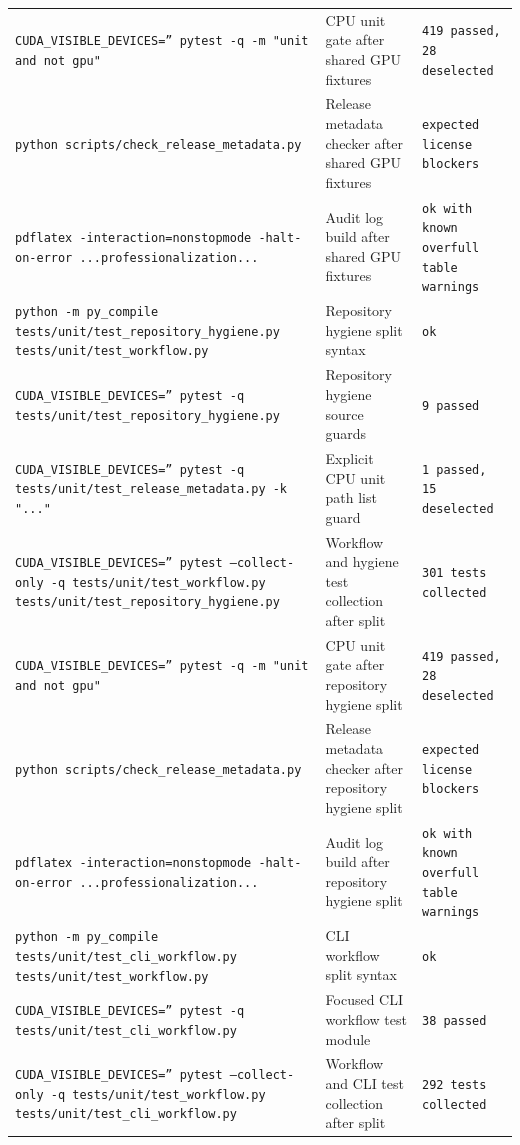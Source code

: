 \documentclass[11pt]{article}
\begin{document}
\begin{center}
\begin{tabular}{lll}
\texttt{CUDA\_VISIBLE\_DEVICES='' pytest -q -m "unit and not gpu"} &
CPU unit gate after shared GPU fixtures &
\texttt{419 passed, 28 deselected} \\
\texttt{python scripts/check\_release\_metadata.py} &
Release metadata checker after shared GPU fixtures &
\texttt{expected license blockers} \\
\texttt{pdflatex -interaction=nonstopmode -halt-on-error ...professionalization...} &
Audit log build after shared GPU fixtures &
\texttt{ok with known overfull table warnings} \\
\texttt{python -m py\_compile tests/unit/test\_repository\_hygiene.py tests/unit/test\_workflow.py} &
Repository hygiene split syntax &
\texttt{ok} \\
\texttt{CUDA\_VISIBLE\_DEVICES='' pytest -q tests/unit/test\_repository\_hygiene.py} &
Repository hygiene source guards &
\texttt{9 passed} \\
\texttt{CUDA\_VISIBLE\_DEVICES='' pytest -q tests/unit/test\_release\_metadata.py -k "..."} &
Explicit CPU unit path list guard &
\texttt{1 passed, 15 deselected} \\
\texttt{CUDA\_VISIBLE\_DEVICES='' pytest --collect-only -q tests/unit/test\_workflow.py tests/unit/test\_repository\_hygiene.py} &
Workflow and hygiene test collection after split &
\texttt{301 tests collected} \\
\texttt{CUDA\_VISIBLE\_DEVICES='' pytest -q -m "unit and not gpu"} &
CPU unit gate after repository hygiene split &
\texttt{419 passed, 28 deselected} \\
\texttt{python scripts/check\_release\_metadata.py} &
Release metadata checker after repository hygiene split &
\texttt{expected license blockers} \\
\texttt{pdflatex -interaction=nonstopmode -halt-on-error ...professionalization...} &
Audit log build after repository hygiene split &
\texttt{ok with known overfull table warnings} \\
\texttt{python -m py\_compile tests/unit/test\_cli\_workflow.py tests/unit/test\_workflow.py} &
CLI workflow split syntax &
\texttt{ok} \\
\texttt{CUDA\_VISIBLE\_DEVICES='' pytest -q tests/unit/test\_cli\_workflow.py} &
Focused CLI workflow test module &
\texttt{38 passed} \\
\texttt{CUDA\_VISIBLE\_DEVICES='' pytest --collect-only -q tests/unit/test\_workflow.py tests/unit/test\_cli\_workflow.py} &
Workflow and CLI test collection after split &
\texttt{292 tests collected} \\

\end{tabular}
\end{center}
\end{document}
